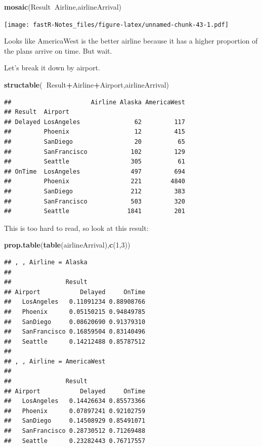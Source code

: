 \documentclass[]{book}
\newenvironment{Shaded}{\begin{snugshade}}{\end{snugshade}}
\newcommand{\KeywordTok}[1]{\textcolor[rgb]{0.13,0.29,0.53}{\textbf{#1}}}
\newcommand{\DecValTok}[1]{\textcolor[rgb]{0.00,0.00,0.81}{#1}}
\newcommand{\OperatorTok}[1]{\textcolor[rgb]{0.81,0.36,0.00}{\textbf{#1}}}
\newcommand{\NormalTok}[1]{#1}
\theoremstyle{definition}
\theoremstyle{definition}
\theoremstyle{definition}
\theoremstyle{remark}
\begin{document}
\begin{Shaded}
\begin{Highlighting}[]
\KeywordTok{mosaic}\NormalTok{(Result}\OperatorTok{~}\NormalTok{Airline,airlineArrival)}
\end{Highlighting}
\end{Shaded}

\texttt{[image: fastR-Notes\_files/figure-latex/unnamed-chunk-43-1.pdf]}

Looks like AmericaWest is the better airline because it has a higher
proportion of the plans arrive on time. But wait.

Let's break it down by airport.

\begin{Shaded}
\begin{Highlighting}[]
\KeywordTok{structable}\NormalTok{(}\OperatorTok{~}\NormalTok{Result}\OperatorTok{+}\NormalTok{Airline}\OperatorTok{+}\NormalTok{Airport,airlineArrival)}
\end{Highlighting}
\end{Shaded}

\begin{verbatim}
##                      Airline Alaska AmericaWest
## Result  Airport                                
## Delayed LosAngeles               62         117
##         Phoenix                  12         415
##         SanDiego                 20          65
##         SanFrancisco            102         129
##         Seattle                 305          61
## OnTime  LosAngeles              497         694
##         Phoenix                 221        4840
##         SanDiego                212         383
##         SanFrancisco            503         320
##         Seattle                1841         201
\end{verbatim}

This is too hard to read, so look at this result:

\begin{Shaded}
\begin{Highlighting}[]
\KeywordTok{prop.table}\NormalTok{(}\KeywordTok{table}\NormalTok{(airlineArrival),}\KeywordTok{c}\NormalTok{(}\DecValTok{1}\NormalTok{,}\DecValTok{3}\NormalTok{))}
\end{Highlighting}
\end{Shaded}

\begin{verbatim}
## , , Airline = Alaska
## 
##               Result
## Airport           Delayed     OnTime
##   LosAngeles   0.11091234 0.88908766
##   Phoenix      0.05150215 0.94849785
##   SanDiego     0.08620690 0.91379310
##   SanFrancisco 0.16859504 0.83140496
##   Seattle      0.14212488 0.85787512
## 
## , , Airline = AmericaWest
## 
##               Result
## Airport           Delayed     OnTime
##   LosAngeles   0.14426634 0.85573366
##   Phoenix      0.07897241 0.92102759
##   SanDiego     0.14508929 0.85491071
##   SanFrancisco 0.28730512 0.71269488
##   Seattle      0.23282443 0.76717557
\end{verbatim}
\end{document}
